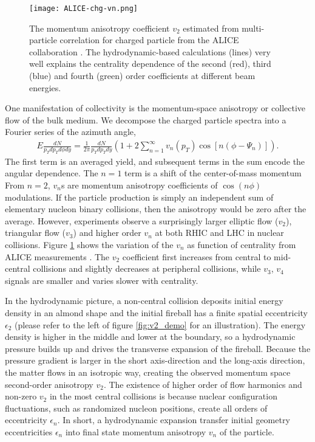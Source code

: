 \begin{figure}
\singlespacing 
\centering
\texttt{[image: ALICE-chg-vn.png]}
\caption[The momentum anisotropy coefficient $v_2$ estimated from]{The momentum anisotropy coefficient $v_2$ estimated from multi-particle correlation for charged particle from the ALICE collaboration \cite{ALICE:2011ab,Adam:2016izf}.
The hydrodynamic-based calculations \cite{Niemi:2015voa,Noronha-Hostler:2015uye} (lines) very well explains the centrality dependence of the second (red), third (blue) and fourth (green) order coefficients at different beam energies.}
\label{fig:intro:vn}
\end{figure}

One manifestation of collectivity is the momentum-space anisotropy or collective flow of the bulk medium.
We decompose the charged particle spectra into a Fourier series of the azimuth angle,
\begin{eqnarray}
E\frac{dN}{p_T dp_T d\phi dy} = \frac{1}{2\pi}\frac{dN}{p_T dp_T dy}\left(1 + 2\sum_{n=1}^{\infty}v_n(p_T)\cos\left[n(\phi-\Psi_n)\right]\right).
\end{eqnarray}
The first term is an averaged yield, and subsequent terms in the sum encode the angular dependence. 
The $n=1$ term is a shift of the center-of-mass momentum
From $n=2$, $v_n$s are momentum anisotropy coefficients of $\cos({n\phi})$ modulations.
If the particle production is simply an independent sum of elementary nucleon binary collisions, then the anisotropy would be zero after the average. 
However, experiments observe a surprisingly larger elliptic flow ($v_2$), triangular flow ($v_3$) and higher order $v_n$ at both RHIC and LHC in nuclear collisions.
Figure \ref{fig:intro:vn} shows the variation of the $v_n$ as function of centrality from ALICE measurements \cite{ALICE:2011ab,Adam:2016izf}.
The $v_2$ coefficient first increases from central to mid-central collisions and slightly decreases at peripheral collisions, while $v_3$, $v_4$ signals are smaller and varies slower with centrality.

In the hydrodynamic picture, a non-central collision deposits initial energy density in an almond shape and the initial fireball has a finite spatial eccentricity $\epsilon_2$ (please refer to the left of figure \ref{fig:v2_demo} for an illustration).
The energy density is higher in the middle and lower at the boundary, so a hydrodynamic pressure builds up and drives the transverse expansion of the fireball.
Because the pressure gradient is larger in the short axis-direction and the long-axis direction, the matter flows in an isotropic way, creating the observed momentum space second-order anisotropy $v_2$.
The existence of higher order of flow harmonics and non-zero $v_2$ in the most central collisions is because nuclear configuration fluctuations, such as randomized nucleon positions, create all orders of eccentricity $\epsilon_n$.
In short, a hydrodynamic expansion transfer initial geometry eccentricities $\epsilon_n$ into final state momentum anisotropy $v_n$ of the particle.

